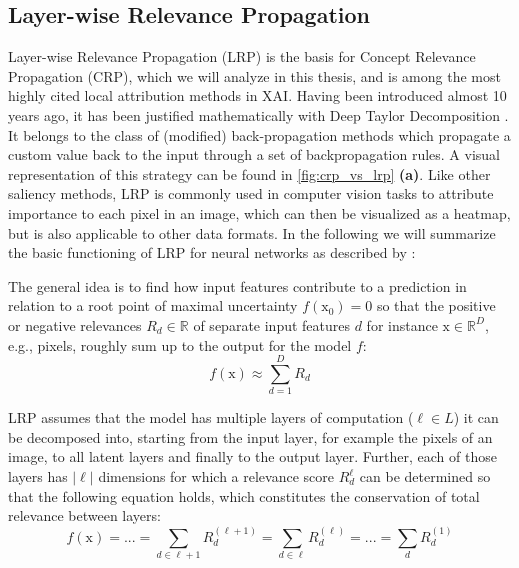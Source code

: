 \subsection{Layer-wise Relevance Propagation}\label{section:lrp}
Layer-wise Relevance Propagation (LRP) \citep{Bach2015} is the basis for Concept Relevance Propagation (CRP), which we will analyze in this thesis, and is among the most highly cited local attribution methods in XAI. Having been introduced almost 10 years ago, it has been justified mathematically with Deep Taylor Decomposition \citep{Montavon2017}. It belongs to the class of (modified) back-propagation methods which propagate a custom value back to the input through a set of backpropagation rules. A visual representation of this strategy can be found in \cref{fig:crp_vs_lrp} \textbf{(a)}. Like other saliency methods, LRP is commonly used in computer vision tasks to attribute importance to each pixel in an image, which can then be visualized as a heatmap, but is also applicable to other data formats. In the following we will summarize the basic functioning of LRP for neural networks as described by \cite{Bach2015}:

The general idea is to find how input features contribute to a prediction in relation to a root point of maximal uncertainty $f(\mathrm{x}_0) = 0$ so that the positive or negative relevances $R_d \in \mathbb{R}$ of separate input features $d$ for instance $\mathrm{x} \in \mathbb{R}^D$, e.g., pixels, roughly sum up to the output for the model $f$:
\begin{equation}\displaystyle
    f(\mathrm{x}) \approx \sum_{d=1}^{D} R_d
\end{equation}

LRP assumes that the model has multiple layers of computation ($\ell \in L$) it can be decomposed into, starting from the input layer, for example the pixels of an image, to all latent layers and finally to the output layer. Further, each of those layers has $|\ell|$ dimensions for which a relevance score $R^{\ell}_d$ can be determined so that the following equation holds, which constitutes the conservation of total relevance between layers:
\begin{equation}
    f(\mathrm{x}) = ... = \sum_{d \in \ell+1} R^{(\ell+1)}_d =  \sum_{d \in \ell} R^{(\ell)}_d = ... =  \sum_{d} R^{(1)}_d
\end{equation}

